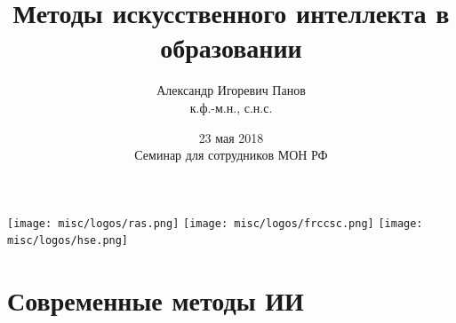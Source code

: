 \documentclass[default]{beamer}
\begin{document}
	
	\title[ИИ в образовании]{Методы искусственного интеллекта в образовании}
	\author[Панов]{Александр Игоревич Панов\\к.ф.-м.н., с.н.с.}
	\date[23 мая]{23 мая 2018\\Семинар для сотрудников МОН РФ} 
	
	\begin{frame}
		\titlepage
		\centering
		\texttt{[image: misc/logos/ras.png]} \hspace{10pt}
		\texttt{[image: misc/logos/frccsc.png]} \hspace{10pt}
		\texttt{[image: misc/logos/hse.png]}
	\end{frame}

	\section{Современные методы ИИ}
\end{document}
